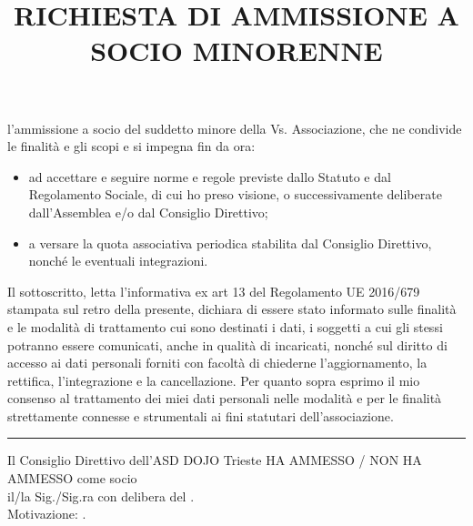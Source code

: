 \documentclass{djtsmod}
\title{RICHIESTA DI AMMISSIONE A SOCIO MINORENNE}
\begin{document}
	\maketitle
	
	
	\basedata
	
	\vspace{0.2in}
	\childbasedata
	
	l'ammissione a socio del suddetto minore della Vs. Associazione, che ne condivide le finalità e gli scopi e si impegna fin da ora:
	\begin{itemize}
		\item ad accettare e seguire norme e regole previste dallo Statuto e dal Regolamento Sociale, di cui ho preso visione, o successivamente deliberate dall’Assemblea e/o dal Consiglio Direttivo;
		\item a versare la quota associativa periodica stabilita dal Consiglio Direttivo, nonché le eventuali integrazioni.
	\end{itemize}
	
	\vspace{10pt}
	Il sottoscritto, letta l’informativa ex art 13 del Regolamento UE 2016/679 stampata sul retro della presente, dichiara di essere stato informato sulle finalità e le modalità di trattamento cui sono destinati i dati, i soggetti a cui gli stessi potranno essere comunicati, anche in qualità di incaricati, nonché sul diritto di accesso ai dati personali forniti con facoltà di chiederne l’aggiornamento, la rettifica, l’integrazione e la cancellazione.
	Per quanto sopra esprimo il mio consenso al trattamento dei miei dati personali nelle modalità e per le finalità strettamente connesse e strumentali ai fini statutari dell’associazione.
	
	\vspace{0.2in}
	\hrule
	
	Il Consiglio Direttivo dell'ASD DOJO Trieste HA AMMESSO / NON HA AMMESSO come socio\\ il/la Sig./Sig.ra \fieldfill\; con delibera del \field{2in}. \\
	Motivazione: \fieldfill.
	
	\vspace{0.2in}
	
\end{document}
